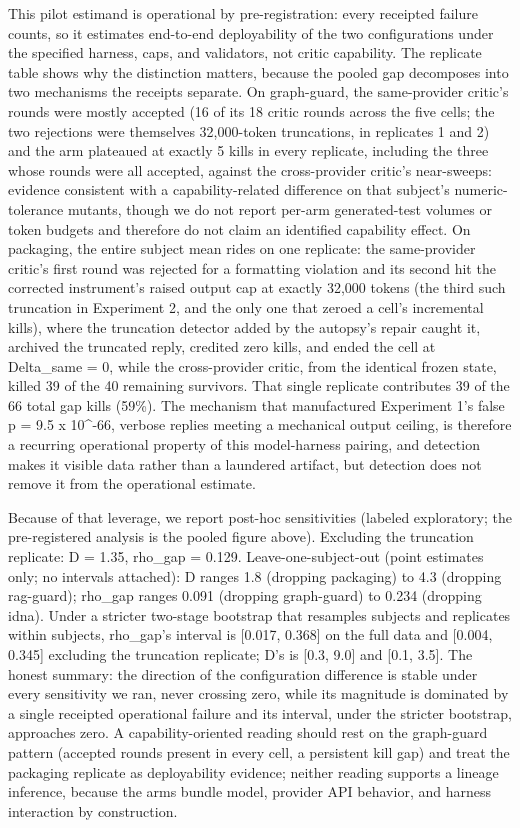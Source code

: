 \documentclass[
  11pt,
]{article}
\begin{document}
This pilot estimand is operational by pre-registration: every receipted
failure counts, so it estimates end-to-end deployability of the two
configurations under the specified harness, caps, and validators, not
critic capability. The replicate table shows why the distinction
matters, because the pooled gap decomposes into two mechanisms the
receipts separate. On graph-guard, the same-provider critic's rounds
were mostly accepted (16 of its 18 critic rounds across the five cells;
the two rejections were themselves 32,000-token truncations, in
replicates 1 and 2) and the arm plateaued at exactly 5 kills in every
replicate, including the three whose rounds were all accepted, against
the cross-provider critic's near-sweeps: evidence consistent with a
capability-related difference on that subject's numeric-tolerance
mutants, though we do not report per-arm generated-test volumes or token
budgets and therefore do not claim an identified capability effect. On
packaging, the entire subject mean rides on one replicate: the
same-provider critic's first round was rejected for a formatting
violation and its second hit the corrected instrument's raised output
cap at exactly 32,000 tokens (the third such truncation in Experiment 2,
and the only one that zeroed a cell's incremental kills), where the
truncation detector added by the autopsy's repair caught it, archived
the truncated reply, credited zero kills, and ended the cell at
Delta\_same = 0, while the cross-provider critic, from the identical
frozen state, killed 39 of the 40 remaining survivors. That single
replicate contributes 39 of the 66 total gap kills (59\%). The mechanism
that manufactured Experiment 1's false p = 9.5 x 10\^{}-66, verbose
replies meeting a mechanical output ceiling, is therefore a recurring
operational property of this model-harness pairing, and detection makes
it visible data rather than a laundered artifact, but detection does not
remove it from the operational estimate.

Because of that leverage, we report post-hoc sensitivities (labeled
exploratory; the pre-registered analysis is the pooled figure above).
Excluding the truncation replicate: D = 1.35, rho\_gap = 0.129.
Leave-one-subject-out (point estimates only; no intervals attached): D
ranges 1.8 (dropping packaging) to 4.3 (dropping rag-guard); rho\_gap
ranges 0.091 (dropping graph-guard) to 0.234 (dropping idna). Under a
stricter two-stage bootstrap that resamples subjects and replicates
within subjects, rho\_gap's interval is {[}0.017, 0.368{]} on the full
data and {[}0.004, 0.345{]} excluding the truncation replicate; D's is
{[}0.3, 9.0{]} and {[}0.1, 3.5{]}. The honest summary: the direction of
the configuration difference is stable under every sensitivity we ran,
never crossing zero, while its magnitude is dominated by a single
receipted operational failure and its interval, under the stricter
bootstrap, approaches zero. A capability-oriented reading should rest on
the graph-guard pattern (accepted rounds present in every cell, a
persistent kill gap) and treat the packaging replicate as deployability
evidence; neither reading supports a lineage inference, because the arms
bundle model, provider API behavior, and harness interaction by
construction.
\end{document}
